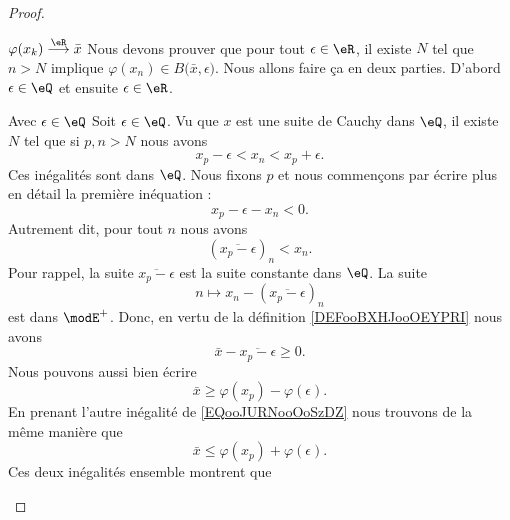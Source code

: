 \begin{proof}
\begin{subproof}
    \item[\( \varphi(x_k)\stackrel{\eR}{\longrightarrow}\bar x\)]
        Nous devons prouver que pour tout \( \epsilon\in \eR\), il existe \( N\) tel que \( n>N\) implique \( \varphi(x_n)\in B\big( \bar x,\epsilon \big)\). Nous allons faire ça en deux parties. D'abord \( \epsilon\in \eQ\) et ensuite \( \epsilon\in \eR\).
        \begin{subproof}
        \item[Avec \( \epsilon\in \eQ\)]
            Soit \( \epsilon\in \eQ\). Vu que \( x\) est une suite de Cauchy dans \( \eQ\), il existe \( N\) tel que si \( p,n>N\) nous avons
            \begin{equation}        \label{EQooJURNooOoSzDZ}
                x_p-\epsilon<x_n<x_p+\epsilon.
            \end{equation}
            Ces inégalités sont dans \( \eQ\). Nous fixons \( p\) et nous commençons par écrire plus en détail la première inéquation :
            \begin{equation}
                x_p-\epsilon-x_n<0.
            \end{equation}
            Autrement dit, pour tout \( n\) nous avons
            \begin{equation}
                (\overline{ x_p-\epsilon })_n<x_n.
            \end{equation}
            Pour rappel, la suite \(  \overline{ x_p-\epsilon } \) est la suite constante dans \( \eQ\). La suite
            \begin{equation}
                n\mapsto x_n-(\overline{ x_p-\epsilon })_n
            \end{equation}
            est dans \( \modE^+\). Donc, en vertu de la définition \ref{DEFooBXHJooOEYPRI} nous avons
            \begin{equation}
                \bar x-\overline{ x_p-\epsilon }\geq 0.
            \end{equation}
            Nous pouvons aussi bien écrire
            \begin{equation}
                \bar x\geq \varphi(x_p)-\varphi(\epsilon).
            \end{equation}
            En prenant l'autre inégalité de \eqref{EQooJURNooOoSzDZ} nous trouvons de la même manière que
            \begin{equation}
                \bar x\leq \varphi(x_p)+\varphi(\epsilon).
            \end{equation}
            Ces deux inégalités ensemble montrent que

\end{subproof}
\end{subproof}
\end{proof}
